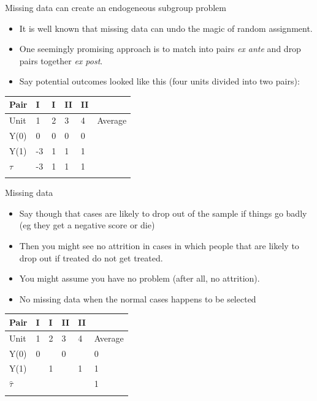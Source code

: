 \documentclass[
  11pt,
  ignorenonframetext,
]{beamer}
\providecommand{\tightlist}{%
  \setlength{\itemsep}{0pt}\setlength{\parskip}{0pt}}\usepackage{longtable,booktabs,array}
\begin{document}
\begin{frame}{Missing data can create an endogeneous subgroup problem}
\protect\hypertarget{missing-data-can-create-an-endogeneous-subgroup-problem}{}
\begin{itemize}
\tightlist
\item
  It is well known that missing data can undo the magic of random
  assignment.
\item
  One seemingly promising approach is to match into pairs
  \textit{ex ante} and drop pairs together \textit{ex post}.
\item
  Say potential outcomes looked like this (four units divided into two
  pairs):
\end{itemize}

\begin{longtable}[]{@{}llllll@{}}
\toprule\noalign{}
Pair & I & I & II & II & \\
\midrule\noalign{}
\endhead
Unit & 1 & 2 & 3 & 4 & Average \\
Y(0) & 0 & 0 & 0 & 0 & \\
Y(1) & -3 & 1 & 1 & 1 & \\
\(\tau\) & -3 & 1 & 1 & 1 & \\
\bottomrule\noalign{}
\end{longtable}
\end{frame}

\begin{frame}{Missing data}
\protect\hypertarget{missing-data}{}
\begin{itemize}
\item
  Say though that cases are likely to drop out of the sample if things
  go badly (eg they get a negative score or die)
\item
  Then you might see no attrition in cases in which people that are
  likely to drop out if treated do not get treated.
\item
  You might assume you have no problem (after all, no attrition).
\item
  No missing data when the normal cases happens to be selected
\end{itemize}

\begin{longtable}[]{@{}llllll@{}}
\toprule\noalign{}
Pair & I & I & II & II & \\
\midrule\noalign{}
\endhead
Unit & 1 & 2 & 3 & 4 & Average \\
Y(0) & 0 & & 0 & & 0 \\
Y(1) & & 1 & & 1 & 1 \\
\(\hat{\tau}\) & & & & & 1 \\
\bottomrule\noalign{}
\end{longtable}
\end{frame}
\end{document}
